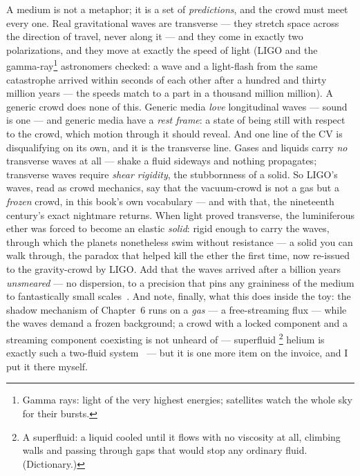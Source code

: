 \documentclass[fontsize=11pt,paper=a4,pagesize=auto,parskip=half-]{scrbook}
\newcommand{\Ixtmp}{}
\DeclareRobustCommand{\Ix}[1]{%
  #1%
  \begingroup
    \lowercase{\gdef\Ixtmp{#1}}%
    \expandafter\index\expandafter{\Ixtmp}%
  \endgroup}
\begin{document}
A medium is not a metaphor; it is a set of \emph{predictions}, and the crowd must meet every one. Real gravitational waves are transverse --- they stretch space across the direction of travel, never along it --- and they come in exactly two polarizations, and they move at exactly the speed of light (LIGO and the gamma-ray\footnote{Gamma rays: light of the very highest energies; satellites watch the whole sky for their bursts.} astronomers checked: a wave and a light-flash from the same catastrophe arrived within seconds of each other after a hundred and thirty million years --- the speeds match to a part in a thousand million million). A generic crowd does none of this. Generic media \emph{love} longitudinal waves --- sound is one --- and generic media have a \emph{rest frame}: a state of being still with respect to the crowd, which motion through it should reveal. And one line of the CV is disqualifying on its own, and it is the transverse line. Gases and liquids carry \emph{no} transverse waves at all --- shake a fluid sideways and nothing propagates; transverse waves require \emph{shear rigidity}, the stubbornness of a solid. So LIGO's waves, read as crowd mechanics, say that the vacuum-crowd is not a gas but a \emph{frozen} crowd, in this book's own vocabulary --- and with that, the nineteenth century's exact nightmare returns. When light proved transverse, the luminiferous \Ix{ether} was forced to become an elastic \emph{solid}: rigid enough to carry the waves, through which the planets nonetheless swim without resistance --- a solid you can walk through, the paradox that helped kill the ether the first time, now re-issued to the gravity-crowd by LIGO. Add that the waves arrived after a billion years \emph{unsmeared} --- no dispersion, to a precision that pins any graininess of the medium to fantastically small scales~\cite{ligo2017graviton}. And note, finally, what this does inside the toy: the shadow mechanism of Chapter~6 runs on a \emph{gas} --- a free-streaming flux --- while the waves demand a frozen background; a crowd with a locked component and a streaming component coexisting is not unheard of --- \Ix{superfluid}\footnote{A superfluid: a liquid cooled until it flows with no viscosity at all, climbing walls and passing through gaps that would stop any ordinary fluid. (Dictionary.)} helium is exactly such a two-fluid system~\cite{tisza1938,landau1941} --- but it is one more item on the invoice, and I put it there myself.
\end{document}
